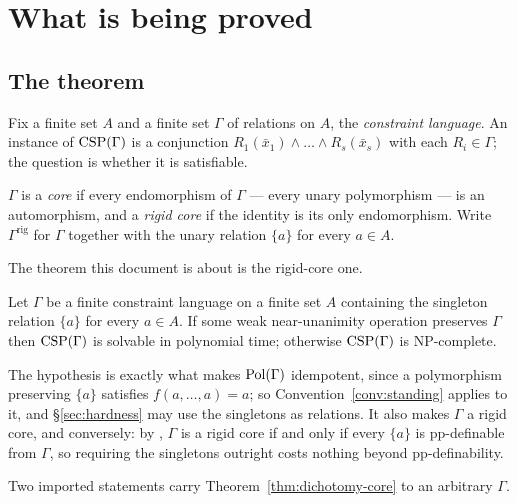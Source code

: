 \section{What is being proved}\label{sec:target}

\subsection{The theorem}

Fix a finite set $A$ and a finite set $\Gamma$ of relations on $A$, the
\emph{constraint language}. An instance of $\operatorname{CSP}(\Gamma)$ is a conjunction
$R_{1}(\bar x_{1})\wedge\dots\wedge R_{s}(\bar x_{s})$ with each
$R_{i}\in\Gamma$; the question is whether it is satisfiable.

\begin{definition}\label{def:core}
$\Gamma$ is a \emph{core} if every endomorphism of $\Gamma$ --- every unary
polymorphism --- is an automorphism, and a \emph{rigid core} if the identity is
its only endomorphism. Write $\Gamma^{\mathrm{rig}}$ for $\Gamma$ together with
the unary relation $\{a\}$ for every $a\in A$.
\end{definition}

The theorem this document is about is the rigid-core one.

\begin{theorem}\label{thm:dichotomy-core}
Let $\Gamma$ be a finite constraint language on a finite set $A$ containing the
singleton relation $\{a\}$ for every $a\in A$. If some weak near-unanimity
operation preserves $\Gamma$ then $\operatorname{CSP}(\Gamma)$ is solvable in polynomial
time; otherwise $\operatorname{CSP}(\Gamma)$ is \textup{NP}-complete.
\end{theorem}

The hypothesis is exactly what makes $\operatorname{Pol}(\Gamma)$ idempotent, since a
polymorphism preserving $\{a\}$ satisfies $f(a,\dots,a)=a$; so
Convention~\ref{conv:standing} applies to it, and \S\ref{sec:hardness} may use
the singletons as relations. It also makes $\Gamma$ a rigid core, and
conversely: by \cite[Thm.~1.4.6]{BradyNotes}, $\Gamma$ is a rigid core if and
only if every $\{a\}$ is pp-definable from $\Gamma$, so requiring the
singletons outright costs nothing beyond pp-definability.

Two imported statements carry Theorem~\ref{thm:dichotomy-core} to an arbitrary
$\Gamma$.

